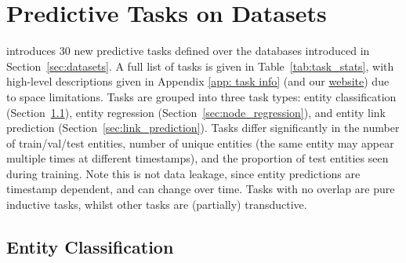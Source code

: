 
\section{Predictive Tasks on \relbench Datasets}
\label{sec:tasks}



\relbench introduces 30 new predictive tasks defined over the databases introduced in Section~\ref{sec:datasets}.
A full list of tasks is given in Table~\ref{tab:task_stats}, with high-level descriptions given in Appendix \ref{app: task info} (and our \href{https://relbench.stanford.edu/}{website}) due to space limitations.
Tasks are grouped into three task types: entity classification (Section~\ref{sec:node_classification}), entity regression (Section~\ref{sec:node_regression}), and entity link prediction (Section~\ref{sec:link_prediction}). Tasks differ significantly in the number of train/val/test entities, number of unique entities (the same entity may appear multiple times at different timestamps), and the proportion of test entities seen during training. Note this is not data leakage, since entity predictions are timestamp dependent, and can change over time. Tasks with no overlap are pure inductive tasks, whilst other tasks are (partially) transductive. 





\subsection{Entity Classification}
\label{sec:node_classification}

